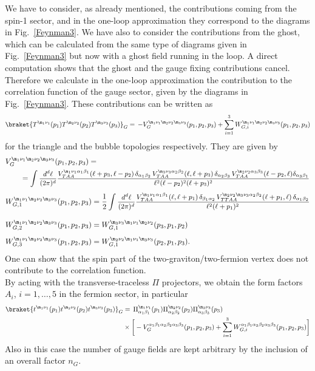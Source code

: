 \documentclass[a4paper,11pt,openright,twoside]{book}
\let\a=\alpha   \let\b=\beta   \let\g=\gamma   \let\d=\delta
\let\n=\nu      \let\x=\xi     \let\p=\pi      \let\r=\rho
\newcommand{\sdfrac}[2]{\mbox{\small$\displaystyle\frac{#1}{#2}$}}
\newcommand{\figref}[1]{Fig.~\ref{#1}}			%
\numberwithin{equation}{section}
\begin{document}
{{We have to consider, as already mentioned, the contributions coming from the spin-1 sector, and in the one-loop approximation they correspond to the diagrams in \figref{Feynman3}. We have also to consider the contributions from the ghost, which can be calculated from the same type of diagrams given in \figref{Feynman3} but now with a ghost field running in the loop. A direct computation shows that the ghost and the gauge fixing contributions cancel.
Therefore we calculate in the one-loop approximation the contribution to the correlation function of the gauge sector, given by the diagrams in \figref{Feynman3}. These contributions can be written as 
\begin{align}
	\braket{T^{\m_1\n_1}(p_1)T^{\m_2\n_2}(p_2)T^{\m_3\n_3}(p_3)}_G=\, -V_{G}^{\m_1\n_1\m_2\n_2\m_3\n_3}(p_1,p_2,p_3)+\sum_{i=1}^3W_{G,i}^{\m_1\n_1\m_2\n_2\m_3\n_3}(p_1,p_2,p_3)\label{GaugeExpa}
\end{align}
for the triangle and the bubble topologies respectively. They are given by
\begin{align}
	&V_{G}^{\m_1\n_1\m_2\n_2\m_3\n_3}(p_1,p_2,p_3)=\notag\\
	&\qquad=\int \sdfrac{d^d\ell}{(2\pi)^d}\sdfrac{V^{\m_1\n_1\a_1\b_1}_{TAA}(\ell+p_3,\ell-p_2)\,\d_{\a_1\b_2}\,V^{\m_3\n_3\a_2\b_2}_{TAA}(\ell,\ell+p_3)\,\d_{\a_2\b_3}\,V^{\m_2\n_2\a_3\b_3}_{TAA}(\ell-p_2,\ell)\d_{\a_3\b_1}}{\ell^2(\ell-p_2)^2(\ell+p_3)^2}
\end{align}
\begin{align}
	W_{G,1}^{\m_1\n_1\m_2\n_2\m_3\n_3}(p_1,p_2,p_3)&=\frac{1}{2}\int \sdfrac{d^d\ell}{(2\pi)^d}\sdfrac{V^{\m_1\n_1\a_1\b_1}_{TAA}(\ell,\ell+p_1)\,\d_{\b_1\a_2}\,V^{\m_2\n_2\m_3\n_3\a_2\b_2}_{TTAA}(\ell+p_1,\ell)\,\d_{\a_1\b_2}}{\ell^2(\ell+p_1)^2}\\[2ex]
	W_{G,2}^{\m_1\n_1\m_2\n_2\m_3\n_3}(p_1,p_2,p_3)&=W_{G,1}^{\m_3\n_3\m_1\n_1\m_2\n_2}(p_3,p_1,p_2)\\[1ex]
	W_{G,3}^{\m_1\n_1\m_2\n_2\m_3\n_3}(p_1,p_2,p_3)&=W_{G,1}^{\m_2\n_2\m_1\n_1\m_3\n_3}(p_2,p_1,p_3).
\end{align}
One can show that the spin part of the two-graviton/two-fermion vertex does not contribute to the correlation function. \\
By acting with the transverse-traceless $\Pi$ projectors, we obtain the form factors $A_i$, $i=1,\dots,5$ in the fermion sector, in particular
\begin{align}
	\braket{t^{\m_1\n_1}(p_1)t^{\m_2\n_2}(p_2)t^{\m_3\n_3}(p_3)}_G&=\,\Pi^{\m_1\n_1}_{\a_1\b_1}(p_1)\Pi^{\m_2\n_2}_{\a_2\b_2}(p_2)\Pi^{\m_3\n_3}_{\a_3\b_3}(p_3)\notag\\
	&\times\bigg[ -V_{G}^{\a_1\b_1\a_2\b_2\a_3\b_3}(p_1,p_2,p_3)+\sum_{i=1}^3W_{G,i}^{\a_1\b_1\a_2\b_2\a_3\b_3}(p_1,p_2,p_3)\bigg]
\end{align}
Also in this case the number of gauge fields are kept arbitrary by the inclusion of an overall factor $n_G$.
}}
\end{document}
